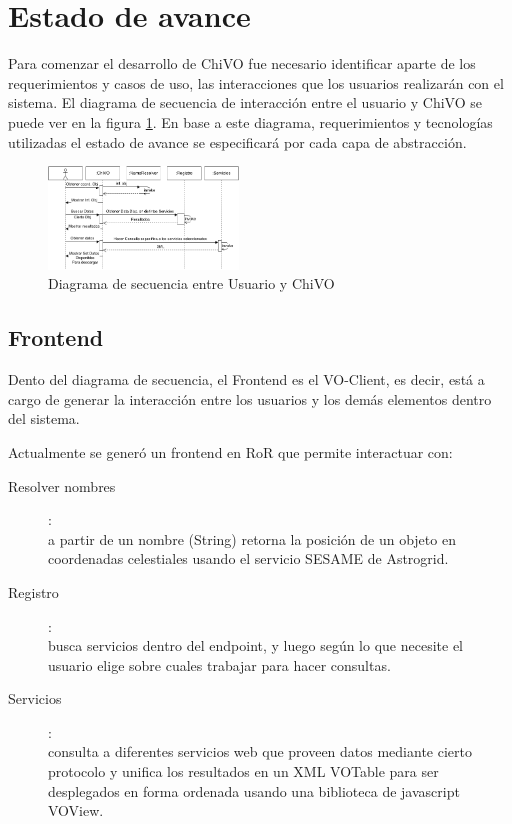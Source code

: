 \section{Estado de avance}

Para comenzar el desarrollo de ChiVO fue necesario identificar aparte de los
requerimientos y casos de uso, las interacciones que los usuarios realizarán
con el sistema. El diagrama de secuencia de interacción entre el usuario y
ChiVO se puede ver en la figura \ref{fig:secuencia}.
En base a este diagrama, requerimientos y tecnologías utilizadas el estado de
avance se especificará por cada capa de abstracción.

\begin{figure}[h!t]
    \centering
    \includegraphics[width=0.45\textwidth]{images/secuencia.png}
    \caption{Diagrama de secuencia entre Usuario y ChiVO}
    \label{fig:secuencia}
\end{figure}

\subsection{Frontend}

Dento del diagrama de secuencia, el Frontend es el VO-Client, es decir, está a cargo
de generar la interacción entre los usuarios y los demás elementos dentro del
sistema.

Actualmente se generó un frontend en RoR que permite interactuar con:

\begin{description}
    \item[Resolver nombres]:\hfill \\
        a partir de un nombre (String) retorna la posición de un objeto en
        coordenadas celestiales usando el servicio SESAME de Astrogrid.
    \item[Registro]: \hfill \\
        busca servicios dentro del endpoint, y luego según lo que necesite el
        usuario elige sobre cuales trabajar para hacer consultas.
    \item[Servicios]: \hfill \\
        consulta a diferentes servicios web que proveen datos mediante cierto
        protocolo y unifica los resultados en un XML VOTable para ser desplegados
        en forma ordenada usando una biblioteca de javascript VOView.
\end{description}

